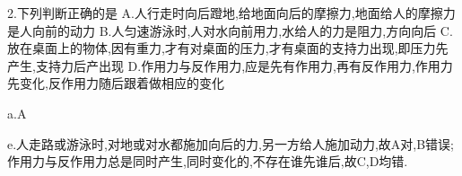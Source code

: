 \begin{selection}
 2.下列判断正确的是
 A.人行走时向后蹬地,给地面向后的摩擦力,地面给人的摩擦力是人向前的动力
 B.人匀速游泳时,人对水向前用力,水给人的力是阻力,方向向后
 C.放在桌面上的物体,因有重力,才有对桌面的压力,才有桌面的支持力出现,即压力先产生,支持力后产出现
 D.作用力与反作用力,应是先有作用力,再有反作用力,作用力先变化,反作用力随后跟着做相应的变化

 a.A

 e.人走路或游泳时,对地或对水都施加向后的力,另一方给人施加动力,故A对,B错误;作用力与反作用力总是同时产生,同时变化的,不存在谁先谁后,故C,D均错.

\end{selection}
